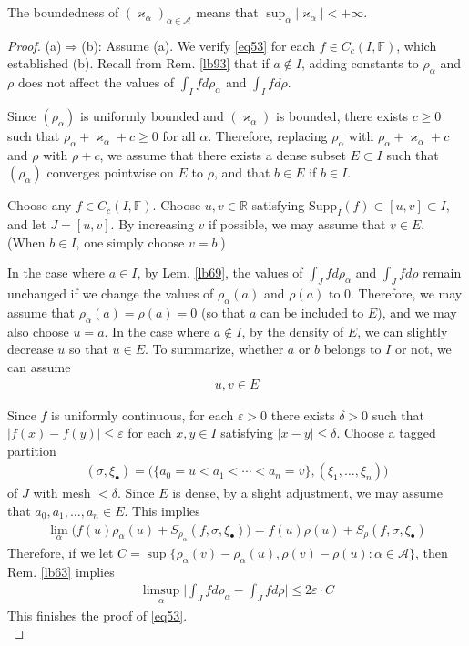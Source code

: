 \documentclass[12pt,b5paper,notitlepage]{article}
\theoremstyle{definition}
\theoremstyle{plain}
\newcommand{\scr}{\mathscr}
\newcommand{\blt}{\bullet}
\newcommand{\Rbb}{\mathbb R}
\newcommand{\Supp}{\mathrm{Supp}}
\newcommand{\Fbb}{\mathbb F}
\newcommand{\eps}{\varepsilon}
\newcommand{\vkp}{\varkappa}
\numberwithin{equation}{section}
\begin{document}
The boundedness of $(\varkappa_\alpha)_{\alpha\in\scr A}$ means that $\sup_\alpha|\vkp_\alpha|<+\infty$.

\begin{proof}
(a)$\Rightarrow$(b): Assume (a). We verify \eqref{eq53} for each $f\in C_c(I,\Fbb)$, which established (b). Recall from Rem. \ref{lb93} that if $a\notin I$, adding constants to $\rho_\alpha$ and $\rho$ does not affect the values of $\int_I fd\rho_\alpha$ and $\int_I fd\rho$. 

Since $(\rho_\alpha)$ is uniformly bounded and $(\vkp_\alpha)$ is bounded, there exists $c\geq0$ such that $\rho_\alpha+\vkp_\alpha+c\geq0$ for all $\alpha$. Therefore, replacing $\rho_\alpha$ with $\rho_\alpha+\vkp_\alpha+c$ and $\rho$ with $\rho+c$, we assume that there exists a dense subset $E\subset I$ such that $(\rho_\alpha)$ converges pointwise on $E$ to $\rho$, and that $b\in E$ if $b\in I$.

Choose any $f\in C_c(I,\Fbb)$. Choose $u,v\in\Rbb$ satisfying $\Supp_I(f)\subset[u,v]\subset I$, and let $J=[u,v]$. By increasing $v$ if possible, we may assume that $v\in E$. (When $b\in I$, one simply choose $v=b$.) 

In the case where $a\in I$, by Lem. \ref{lb69}, the values of $\int_J fd\rho_\alpha$ and $\int_J fd\rho$ remain unchanged if we change the values of $\rho_\alpha(a)$ and $\rho(a)$ to $0$. Therefore,  we may assume that $\rho_\alpha(a)=\rho(a)=0$ (so that $a$ can be included to $E$), and we may also choose $u=a$. In the case where $a\notin I$, by the density of $E$, we can slightly decrease $u$ so that $u\in E$. To summarize, whether $a$ or $b$ belongs to $I$ or not, we can assume 
\begin{align*}
u,v\in E
\end{align*}

Since $f$ is uniformly continuous, for each $\eps>0$ there exists $\delta>0$ such that $|f(x)-f(y)|\leq\eps$ for each $x,y\in I$ satisfying $|x-y|\leq\delta$. Choose a tagged partition
\begin{align*}
(\sigma,\xi_\blt)=\big(\{a_0=u<a_1<\cdots<a_n=v\},(\xi_1,\dots,\xi_n) \big)
\end{align*}
of $J$ with mesh $<\delta$. Since $E$ is dense, by a slight adjustment, we may assume that $a_0,a_1,\dots,a_n\in E$. This implies
\begin{align*}
\lim_\alpha \big(f(u)\rho_\alpha(u)+S_{\rho_\alpha}(f,\sigma,\xi_\blt)\big)=f(u)\rho(u)+S_\rho(f,\sigma,\xi_\blt)
\end{align*}
Therefore, if we let $C=\sup\{\rho_\alpha(v)-\rho_\alpha(u),\rho(v)-\rho(u):\alpha\in\scr A\}$, then Rem. \ref{lb63} implies
\begin{align*}
\limsup_\alpha \Big|\int_J fd\rho_\alpha-\int_J fd\rho\Big|\leq 2\eps\cdot C
\end{align*}
This finishes the proof of \eqref{eq53}.\\[-1ex]


\end{proof}
\end{document}
